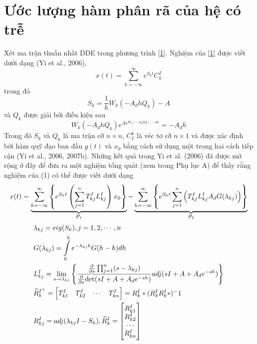 \section{Ước lượng hàm phân rã của hệ có trễ}
Xét ma trận thuần nhất DDE trong phương trình \eqref{1}. Nghiệm của \eqref{1} được viết dưới dạng (Yi et al., 2006),
%
\begin{equation}\label{8}
	x(t) = \sum_{k = -\infty}^{\infty} e^{S_kt}C_k^I
\end{equation}
%  
trong đó
%
\begin{equation}\label{9}
	S_k = \dfrac{1}{h} W_k(-A_dhQ_k) -A
\end{equation} 
%
và $Q_k$  được giải bởi điều kiện sau
%
\begin{equation}\label{10}
	W_k(-A_dhQ_k)e^{Ae^{W_k(-A_dhQ)-Ah}} = -A_dh
\end{equation}
%
Trong đó $S_k$ và $Q_k$ là ma trận cỡ $n \times n$, $C_I^k$ là véc tơ cỡ $n \times 1$ và được xác định bởi hàm quỹ đạo ban đầu $g(t)$ và $x_0$ bằng cách sử dụng một trong hai cách tiếp cận (Yi et al., 2006, 2007b).
%
Những kết quả trong Yi et al. (2006) đã được mở rộng ở đây để đưa ra một nghiệm tổng quát (xem trong Phụ lục A) để thấy rằng nghiệm của (1) có thể được viết dưới dạng
%
\begin{equation}\label{11}
	x(t) = \underbrace{\sum_{k = -\infty}^{\infty} \left\{e^{S_k t} \left( \sum_{j=1}^{n} T^I_{kj} L^I_{kj} \right)x_0 \right\}}_{P_1} - \underbrace{\sum_{k = -\infty}^{\infty} \left\{e^{S_k t} \sum_{j=1}^{n} \left(T^I_{kj} L^I_{kj} A_d G(\lambda_{kj}) \right)\right\}}_{P_2}
\end{equation}
%
%
\begin{align}\label{12}
	&\lb_{kj}=eig(S_k), j = 1,2,\cdots, n\\
%
	&G(\lb_{kj})= \int \limits^h_0 e^{-\lb_{kj}h } G(h  - h) d h \\
%	
	&L^I_{kj} = \lim\limits_{s\to \lb_{kj}}	\left\{ \dfrac{\frac{\partial }{\partial s} \prod_{j=1}^{n} (s - \lb_{kj})}{\frac{\partial }{\partial s} \text{det} (s I + A + A_d e^{-sh})} adj(s I + A + A_d e^{-sh}) \right\}\\
% 
	& \tR^{I^+}_k = \begin{bmatrix}
		T_{k1}^I & T_{k2}^I & \cdots & T_{kn}^I
	\end{bmatrix} = R^I_k*(R^I_k R^I_k*)^-1\\
%
	& R_{kj}^I = adj (\lb_{kj}I - S_k), \tR_k^I = \m{R^I_{k1} \\R^I_{k2} \\  \cdots \\R^I_{kn} }
\end{align}
